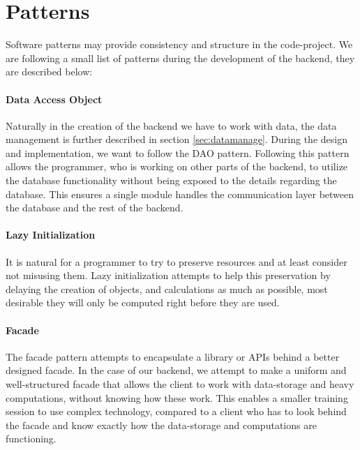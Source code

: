 \section{Patterns}
\label{sec:bpatterns}
Software patterns may provide consistency and structure in the code-project. We are following a small list of patterns during the development of the backend, they are described below:

\paragraph{Data Access Object}
Naturally in the creation of the backend we have to work with data, the data management is further described in section \ref{sec:datamanage}. During the design and implementation, we want to follow the DAO pattern. Following this pattern allows the programmer, who is working on other parts of the backend, to utilize the database functionality without being exposed to the details regarding the database. This ensures a single module handles the communication layer between the database and the rest of the backend.

\paragraph{Lazy Initialization}
It is natural for a programmer to try to preserve resources and at least consider not misusing them. Lazy initialization attempts to help this preservation by delaying the creation of objects, and calculations as much as possible, most desirable they will only be computed right before they are used.

\paragraph{Facade}
The facade pattern attempts to encapsulate a library or APIs behind a better designed facade. In the case of our backend, we attempt to make a uniform and well-structured facade that allows the client to work with data-storage and heavy computations, without knowing how these work. This enables a smaller training session to use complex technology, compared to a client who has to look behind the facade and know exactly how the data-storage and computations are functioning.
